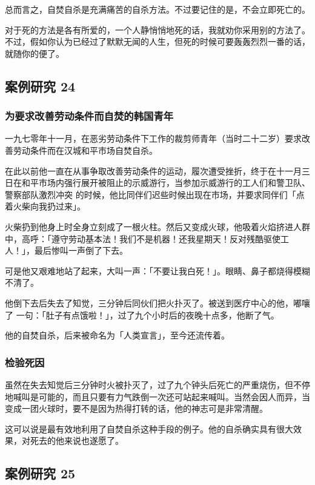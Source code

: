 \documentclass[UTF8]{ctexart}
\begin{document}
总而言之，自焚自杀是充满痛苦的自杀方法。不过要记住的是，不会立即死亡的。

对于死的方法是各有所爱的，一个人静悄悄地死的话，我就劝你采用别的方法了。不过，假如你认为已经过了默默无闻的人生，但死的时候可要轰轰烈烈一番的话，就随你的便了。

\subsection{案例研究 24}

\subsubsection*{为要求改善劳动条件而自焚的韩国青年}

一九七零年十一月，在恶劣劳动条件下工作的裁剪师青年（当时二十二岁）要求改善劳动条件而在汉城和平市场自焚自杀。

在此以前他一直在从事争取改善劳动条件的运动，履次遭受挫折，终于在十一月三日在和平市场内强行展开被阻止的示威游行，当参加示威游行的工人们和警卫队、警察部队激烈冲突 的时候，他比同伴们迟些时候出现在市场，并要求同伴们「点着火柴向我扔过来」。

火柴扔到他身上时全身立刻成了一根火柱。然后又变成火球，他吸着火焰挤进人群中，高呼：「遵守劳动基本法！我们不是机器！还我星期天！反对残酷驱使工人！」，最后惨叫一声倒了下去。

可是他又艰难地站了起来，大叫一声：「不要让我白死！」。眼睛、鼻子都烧得模糊不清了。

他倒下去后失去了知觉，三分钟后同伙们把火扑灭了。被送到医疗中心的他，嘟嚷了 一句：「肚子有点饿啦！」，过了九个小时后的夜晚十点多，他断了气。

他的自焚自杀，后来被命名为「人类宣言」，至今还流传着。

\subsubsection*{检验死因}

虽然在失去知觉后三分钟时火被扑灭了，过了九个钟头后死亡的严重烧伤，但不停地喊叫是可能的，而且只要有力气跌倒一次还可站起来喊叫。当然会因人而异，当变成一团火球时，要不是因为热得打转的话，他的神志可是非常清醒。

这可以说是最有效地利用了自焚自杀这种手段的例子。他的自杀确实具有很大效果，对死去的他来说也遂愿了。

\subsection{案例研究 25}
\end{document}
